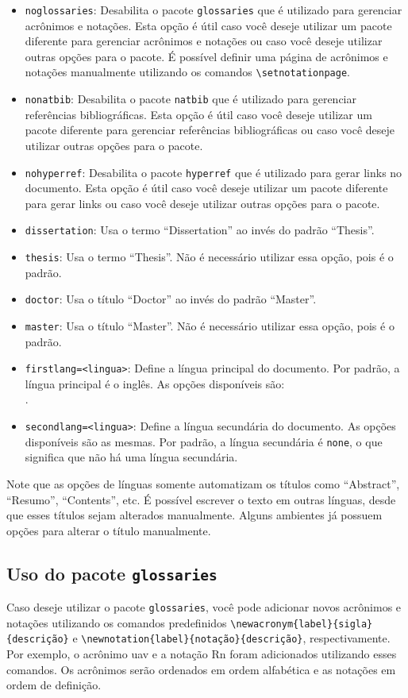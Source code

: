 \documentclass[dissertation,master,firstlang=english,secondlang=brazil]{macrothesis}
\begin{document}
\begin{itemize}
    \item \texttt{noglossaries}: Desabilita o pacote \texttt{glossaries} que é utilizado para gerenciar acrônimos e notações. Esta opção é útil caso você deseje utilizar um pacote diferente para gerenciar acrônimos e notações ou caso você deseje utilizar outras opções para o pacote. É possível definir uma página de acrônimos e notações manualmente utilizando os comandos \texttt{\textbackslash setnotationpage}.
    \item \texttt{nonatbib}: Desabilita o pacote \texttt{natbib} que é utilizado para gerenciar referências bibliográficas. Esta opção é útil caso você deseje utilizar um pacote diferente para gerenciar referências bibliográficas ou caso você deseje utilizar outras opções para o pacote.
    \item \texttt{nohyperref}: Desabilita o pacote \texttt{hyperref} que é utilizado para gerar links no documento. Esta opção é útil caso você deseje utilizar um pacote diferente para gerar links ou caso você deseje utilizar outras opções para o pacote.
    \item \texttt{dissertation}: Usa o termo ``Dissertation'' ao invés do padrão ``Thesis''.
    \item \texttt{thesis}: Usa o termo ``Thesis''. Não é necessário utilizar essa opção, pois é o padrão.
    \item \texttt{doctor}: Usa o título ``Doctor'' ao invés do padrão ``Master''.
    \item \texttt{master}: Usa o título ``Master''. Não é necessário utilizar essa opção, pois é o padrão.
    \item \texttt{firstlang=<lingua>}: Define a língua principal do documento. Por padrão, a língua principal é o inglês. As opções disponíveis são: \\\emph{\supportedlangs}. 
    \item \texttt{secondlang=<lingua>}: Define a língua secundária do documento. As opções disponíveis são as mesmas. Por padrão, a língua secundária é \texttt{none}, o que significa que não há uma língua secundária.
\end{itemize}
Note que as opções de línguas somente automatizam os títulos como ``Abstract'', ``Resumo'', ``Contents'', etc. É possível escrever o texto em outras línguas, desde que esses títulos sejam alterados manualmente. Alguns ambientes já possuem opções para alterar o título manualmente.

\subsection{Uso do pacote \texttt{glossaries}}
Caso deseje utilizar o pacote \texttt{glossaries}, você pode adicionar novos acrônimos e notações utilizando os comandos predefinidos \texttt{\textbackslash newacronym\{label\}\{sigla\}\{descrição\}} e \texttt{\textbackslash newnotation\{label\}\{notação\}\{descrição\}}, respectivamente. Por exemplo, o acrônimo \gls{uav} e a notação \gls{Rn} foram adicionados utilizando esses comandos. Os acrônimos serão ordenados em ordem alfabética e as notações em ordem de definição.
\end{document}
